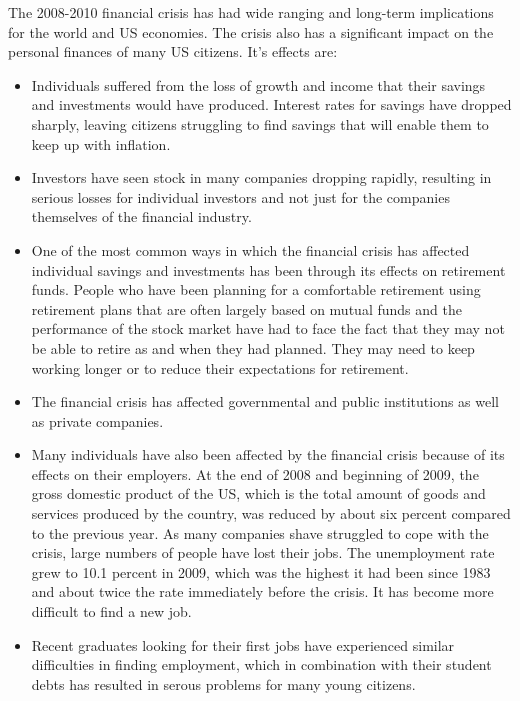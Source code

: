 \documentclass[11pt]{article}
\numberwithin{equation}{section}
\begin{document}
The 2008-2010 financial crisis has had wide ranging and long-term implications for the world and US economies. The crisis also has a significant impact on the personal finances of many US citizens. It's effects are: 
\begin{itemize}
\item Individuals suffered from the loss of growth and income that their savings and investments would have produced. Interest rates for savings have dropped sharply, leaving citizens struggling to find savings that will enable them to keep up with inflation.

\item Investors have seen stock in many companies dropping rapidly, resulting in serious losses for individual investors and not just for the companies themselves of the financial industry.

\item One of the most common ways in which the financial crisis has affected individual savings and investments has been through its effects on retirement funds. People who have been planning for a comfortable retirement using retirement plans that are often largely based on mutual funds and the performance of the stock market have had to face the fact that they may not be able to retire as and when they had planned. They may need to keep working longer or to reduce their expectations for retirement.

\item The financial crisis has affected governmental and public institutions as well as private companies.

\item Many individuals have also been affected by the financial crisis because of its effects on their employers. At the end of 2008 and beginning of 2009, the gross domestic product of the US, which is the total amount of goods and services produced by the country, was reduced by about six percent compared to the previous year. As many companies shave struggled to cope with the crisis, large numbers of people have lost their jobs. The unemployment rate grew to 10.1 percent in 2009, which was the highest it had been since 1983 and about twice the rate immediately before the crisis. It has become more difficult to find a new job. 

\item Recent graduates looking for their first jobs have experienced similar difficulties in finding employment, which in combination with their student debts has resulted in serous problems for many young citizens.


\end{itemize}
\end{document}
